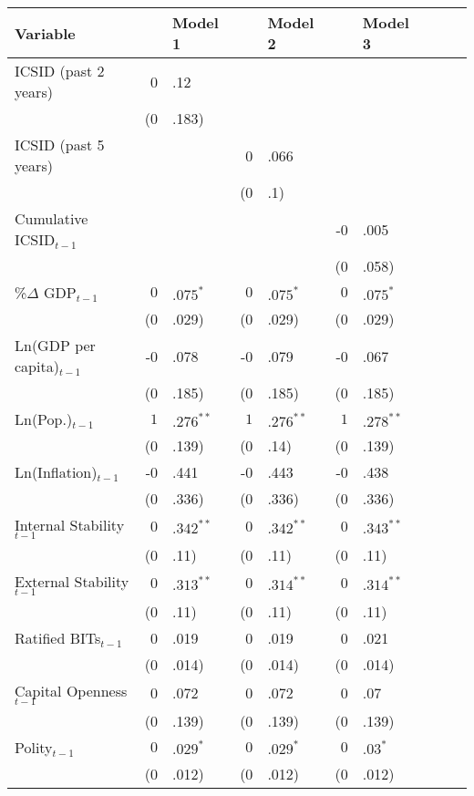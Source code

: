 \begin{enumerate}
\begin{itemize}
			\begin{table}[ht]
			\centering
			\begingroup\footnotesize
			\begin{tabular}{lr@{} lr@{}lr@{}lr@{}lr@{}}
			Variable && Model 1 && Model 2 && Model 3 \\ 
			  \hline
			\hline
			ICSID  (past 2 years) & 0&.12 &&  &&  \\ 
			   & (0&.183) &&  &&  \\ 
			  ICSID  (past 5 years) &  && 0&.066 &&  \\ 
			   &  && (0&.1) &&  \\ 
			  Cumulative ICSID$_{t-1}$ &&  &&  & -0&.005 \\ 
			   &&  &&  & (0&.058) \\ 
			  \%$\Delta$ GDP$_{t-1}$ & $0$&$.075^{\ast}$ & $0$&$.075^{\ast}$ & $0$&$.075^{\ast}$ \\ 
			   & (0&.029) & (0&.029) & (0&.029) \\ 
			  Ln(GDP per capita)$_{t-1}$ & -0&.078 & -0&.079 & -0&.067 \\ 
			   & (0&.185) & (0&.185) & (0&.185) \\ 
			  Ln(Pop.)$_{t-1}$ & $1$&$.276^{\ast\ast}$ & $1$&$.276^{\ast\ast}$ & $1$&$.278^{\ast\ast}$ \\ 
			   & (0&.139) & (0&.14) & (0&.139) \\ 
			  Ln(Inflation)$_{t-1}$ & -0&.441 & -0&.443 & -0&.438 \\ 
			   & (0&.336) & (0&.336) & (0&.336) \\ 
			  Internal Stability$_{t-1}$ & $0$&$.342^{\ast\ast}$ & $0$&$.342^{\ast\ast}$ & $0$&$.343^{\ast\ast}$ \\ 
			   & (0&.11) & (0&.11) & (0&.11) \\ 
			  External Stability$_{t-1}$ & $0$&$.313^{\ast\ast}$ & $0$&$.314^{\ast\ast}$ & $0$&$.314^{\ast\ast}$ \\ 
			   & (0&.11) & (0&.11) & (0&.11) \\ 
			  Ratified BITs$_{t-1}$ & 0&.019 & 0&.019 & 0&.021 \\ 
			   & (0&.014) & (0&.014) & (0&.014) \\ 
			  Capital Openness$_{t-1}$ & 0&.072 & 0&.072 & 0&.07 \\ 
			   & (0&.139) & (0&.139) & (0&.139) \\ 
			  Polity$_{t-1}$ & $0$&$.029^{\ast}$ & $0$&$.029^{\ast}$ & $0$&$.03^{\ast}$ \\ 
			   & (0&.012) & (0&.012) & (0&.012) \\ 

\end{tabular}
\end{table}
\end{itemize}
\end{enumerate}
